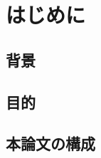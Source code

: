 \documentclass[a4paper,11pt,uplatex]{ujreport}
\begin{document}
\tableofcontents

\clearpage


\chapter{はじめに}
\label{chap:Introduction}


\section{背景}
\label{sec:背景}


\section{目的}
\label{sec:目的}





\section{本論文の構成}
\label{sec:本論文の構成}
\end{document}
